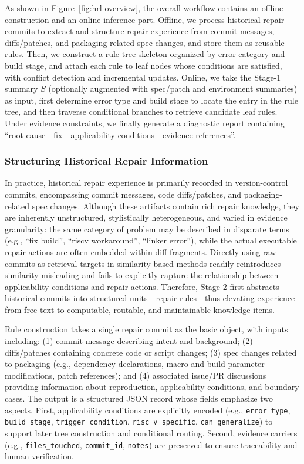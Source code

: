 \documentclass[sigconf]{acmart}
\begin{document}
As shown in Figure~\ref{fig:hrl-overview}, the overall workflow contains an offline construction and an online inference part. Offline, we process historical repair commits to extract and structure repair experience from commit messages, diffs/patches, and packaging-related spec changes, and store them as reusable rules. Then, we construct a rule-tree skeleton organized by error category and build stage, and attach each rule to leaf nodes whose conditions are satisfied, with conflict detection and incremental updates. Online, we take the Stage-1 summary $S$ (optionally augmented with spec/patch and environment summaries) as input, first determine error type and build stage to locate the entry in the rule tree, and then traverse conditional branches to retrieve candidate leaf rules. Under evidence constraints, we finally generate a diagnostic report containing ``root cause---fix---applicability conditions---evidence references''.

\subsubsection{Structuring Historical Repair Information}

In practice, historical repair experience is primarily recorded in version-control commits, encompassing commit messages, code diffs/patches, and packaging-related spec changes. Although these artifacts contain rich repair knowledge, they are inherently unstructured, stylistically heterogeneous, and varied in evidence granularity: the same category of problem may be described in disparate terms (e.g., ``fix build'', ``riscv workaround'', ``linker error''), while the actual executable repair actions are often embedded within diff fragments. Directly using raw commits as retrieval targets in similarity-based methods readily reintroduces similarity misleading and fails to explicitly capture the relationship between applicability conditions and repair actions. Therefore, Stage-2 first abstracts historical commits into structured units---repair rules---thus elevating experience from free text to computable, routable, and maintainable knowledge items.

\begin{sloppypar}
Rule construction takes a single repair commit as the basic object, with inputs including: (1) commit message describing intent and background; (2) diffs/patches containing concrete code or script changes; (3) spec changes related to packaging (e.g., dependency declarations, macro and build-parameter modifications, patch references); and (4) associated issue/PR discussions providing information about reproduction, applicability conditions, and boundary cases. The output is a structured JSON record whose fields emphasize two aspects. First, applicability conditions are explicitly encoded (e.g., \texttt{error\_type}, \texttt{build\_stage}, \texttt{trigger\_condition}, \texttt{risc\_v\_specific}, \texttt{can\_generalize}) to support later tree construction and conditional routing. Second, evidence carriers (e.g., \texttt{files\_touched}, \texttt{commit\_id}, \texttt{notes}) are preserved to ensure traceability and human verification.
\end{sloppypar}
\end{document}
